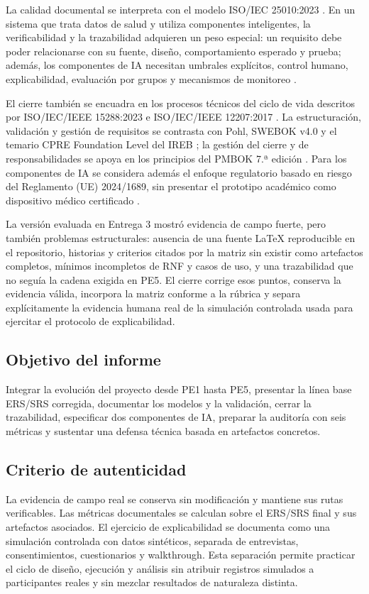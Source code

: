 \documentclass[12pt,a4paper]{article}
\begin{document}
La calidad documental se interpreta con el modelo ISO/IEC 25010:2023 \cite{iso25010}. En un sistema que trata datos de salud y utiliza componentes inteligentes, la verificabilidad y la trazabilidad adquieren un peso especial: un requisito debe poder relacionarse con su fuente, diseño, comportamiento esperado y prueba; además, los componentes de IA necesitan umbrales explícitos, control humano, explicabilidad, evaluación por grupos y mecanismos de monitoreo \cite{chazette2022,holzinger2017}.

El cierre también se encuadra en los procesos técnicos del ciclo de vida descritos por ISO/IEC/IEEE 15288:2023 e ISO/IEC/IEEE 12207:2017 \cite{iso15288,iso12207}. La estructuración, validación y gestión de requisitos se contrasta con Pohl, SWEBOK v4.0 y el temario CPRE Foundation Level del IREB \cite{pohl2025,swebok4,ireb330}; la gestión del cierre y de responsabilidades se apoya en los principios del PMBOK 7.ª edición \cite{pmbok7}. Para los componentes de IA se considera además el enfoque regulatorio basado en riesgo del Reglamento (UE) 2024/1689, sin presentar el prototipo académico como dispositivo médico certificado \cite{euai2024}.

La versión evaluada en Entrega 3 mostró evidencia de campo fuerte, pero también problemas estructurales: ausencia de una fuente LaTeX reproducible en el repositorio, historias y criterios citados por la matriz sin existir como artefactos completos, mínimos incompletos de RNF y casos de uso, y una trazabilidad que no seguía la cadena exigida en PE5. El cierre corrige esos puntos, conserva la evidencia válida, incorpora la matriz conforme a la rúbrica y separa explícitamente la evidencia humana real de la simulación controlada usada para ejercitar el protocolo de explicabilidad.

\subsection{Objetivo del informe}
Integrar la evolución del proyecto desde PE1 hasta PE5, presentar la línea base ERS/SRS corregida, documentar los modelos y la validación, cerrar la trazabilidad, especificar dos componentes de IA, preparar la auditoría con seis métricas y sustentar una defensa técnica basada en artefactos concretos.

\subsection{Criterio de autenticidad}
La evidencia de campo real se conserva sin modificación y mantiene sus rutas verificables. Las métricas documentales se calculan sobre el ERS/SRS final y sus artefactos asociados. El ejercicio de explicabilidad se documenta como una simulación controlada con datos sintéticos, separada de entrevistas, consentimientos, cuestionarios y walkthrough. Esta separación permite practicar el ciclo de diseño, ejecución y análisis sin atribuir registros simulados a participantes reales y sin mezclar resultados de naturaleza distinta.
\end{document}
